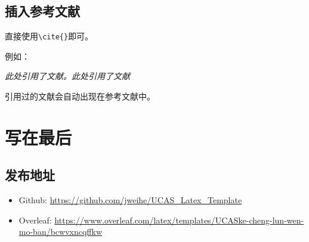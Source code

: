 \documentclass[12pt,hyperref,a4paper,UTF8]{ctexart}
\begin{document}
%
%
%
%
%
%

\subsection{插入参考文献}
直接使用\verb|\cite{}|即可。

例如：


   \textit{ 此处引用了文献\cite{0Isaac}。此处引用了文献\cite{2016The}}


引用过的文献会自动出现在参考文献中。

\section{写在最后}
\subsection{发布地址}
\begin{itemize}
    \item Github: \url{https://github.com/jweihe/UCAS_Latex_Template}
    \item Overleaf:  \url{https://www.overleaf.com/latex/templates/UCASke-cheng-lun-wen-mo-ban/bcwvxncqffkw}
\end{itemize}


\end{document}
